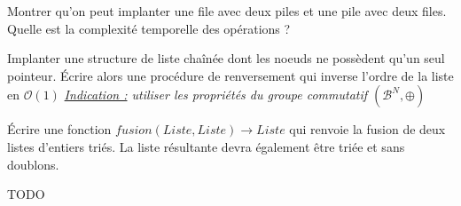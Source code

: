\documentclass[../../../main.tex]{subfiles}
\begin{document}
 Montrer qu'on peut implanter une file avec deux piles et une pile avec deux files. Quelle est la complexité temporelle des opérations ?

 Implanter une structure de liste chaînée dont les noeuds ne possèdent qu'un seul pointeur. Écrire alors une procédure de renversement qui inverse l'ordre de la liste en $\mathcal{O}(1)$ \newline
\textit{\underline{Indication :} utiliser les propriétés du groupe commutatif $(\mathcal{B}^N, \oplus)$}

 Écrire une fonction $fusion(Liste, Liste) \rightarrow Liste$ qui renvoie la fusion de deux listes d'entiers triés. La liste résultante devra également être triée et sans doublons.

 TODO
\end{document}
